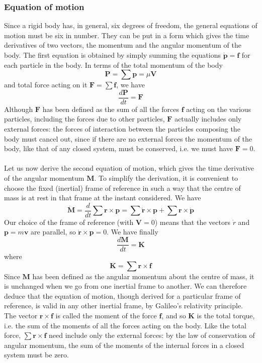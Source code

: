 \subsubsection{Equation of motion}
Since a rigid body has, in general, six degrees of freedom, the general equations of motion must be six in number. They can be put in a form which gives the time derivatives of two vectors, the momentum and the angular momentum of the body.
The first equation is obtained by simply summing the equations $\dot{\bm{p}} = \bm{f}$ for each particle in the body. In terms of the total momentum of the body
\[\bm{P} = \sum \bm{p} = \mu\bm{V}\]
and total force acting on it $\bm{F} = \sum \bm{f}$, we have
\[\frac{d\bm{P}}{dt} = \bm{F}\]
Although $\bm{F}$ has been defined as the sum of all the forces $\bm{f}$ acting on the various particles, including the forces due to other particles, $\bm{F}$ actually includes only external forces: the forces of interaction between the particles composing the body must cancel out, since if there are no external forces the momentum of the body, like that of any closed system, must be conserved, i.e. we must have $\bm{F} = 0$. \\ \\
Let us now derive the second equation of motion, which gives the time derivative of the angular momentum $\bm{M}$. 
To simplify the derivation, it is convenient to choose the fixed (inertial) frame of reference in such a way that the centre of mass is at rest in that frame at the instant considered. We have
\[\dot{\bm{M}} = \frac{d}{dt} \sum \bm{r} \times \bm{p} = \sum \bm{\dot{r}} \times \bm{p} + \sum \bm{r} \times \dot{\bm{p}}\]
Our choice of the frame of reference (with $\bm{V} = 0$) means that the vectors $\dot{r}$ and $\bm{p} = m\bm{v}$ are parallel, so $\dot{\bm{r}} \times \bm{p} = 0$. We have finally
\[\frac{d\bm{M}}{dt} = \bm{K}\]
where
\[\bm{K} = \sum \bm{r} \times \bm{f}\]
Since $\bm{M}$ has been defined as the angular momentum about the centre of mass, it is unchanged when we go from one inertial frame to another. We can therefore deduce that the equation of motion, though derived for a particular frame of reference, is valid in any other inertial frame, by Galileo's relativity principle.\\
The vector $\bm{r}\times \bm{f}$ is called the moment of the force $\bm{f}$, and so $\bm{K}$ is the total torque, i.e. the sum of the moments of all the forces acting on the body. Like the total force, $\sum \bm{r} \times \bm{f}$ need include only the external forces: by the law of conservation of angular momentum, the sum of the moments of the internal forces in a closed system must be zero.

